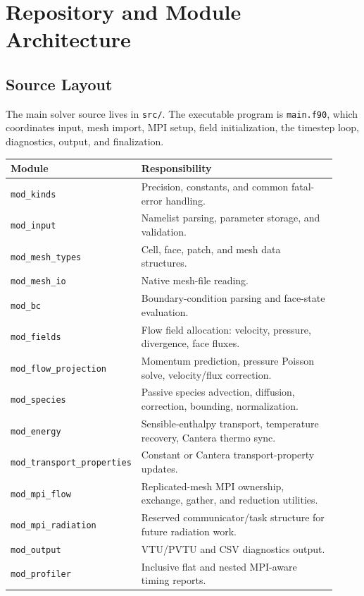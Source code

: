 \documentclass[11pt]{article}
\begin{document}
\section{Repository and Module Architecture}

\subsection{Source Layout}

The main solver source lives in \texttt{src/}.  The executable program is
\texttt{main.f90}, which coordinates input, mesh import, MPI setup, field
initialization, the timestep loop, diagnostics, output, and finalization.

\begin{longtable}{p{0.28\linewidth}p{0.64\linewidth}}
\toprule
\textbf{Module} & \textbf{Responsibility} \\
\midrule
\texttt{mod\_kinds} & Precision, constants, and common fatal-error handling. \\
\texttt{mod\_input} & Namelist parsing, parameter storage, and validation. \\
\texttt{mod\_mesh\_types} & Cell, face, patch, and mesh data structures. \\
\texttt{mod\_mesh\_io} & Native mesh-file reading. \\
\texttt{mod\_bc} & Boundary-condition parsing and face-state evaluation. \\
\texttt{mod\_fields} & Flow field allocation: velocity, pressure, divergence, face fluxes. \\
\texttt{mod\_flow\_projection} & Momentum prediction, pressure Poisson solve, velocity/flux correction. \\
\texttt{mod\_species} & Passive species advection, diffusion, correction, bounding, normalization. \\
\texttt{mod\_energy} & Sensible-enthalpy transport, temperature recovery, Cantera thermo sync. \\
\texttt{mod\_transport\_properties} & Constant or Cantera transport-property updates. \\
\texttt{mod\_mpi\_flow} & Replicated-mesh MPI ownership, exchange, gather, and reduction utilities. \\
\texttt{mod\_mpi\_radiation} & Reserved communicator/task structure for future radiation work. \\
\texttt{mod\_output} & VTU/PVTU and CSV diagnostics output. \\
\texttt{mod\_profiler} & Inclusive flat and nested MPI-aware timing reports. \\
\bottomrule
\end{longtable}
\end{document}
